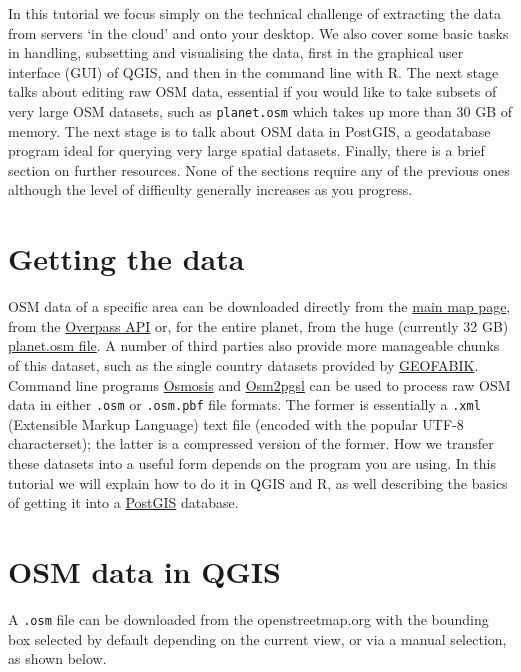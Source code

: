 \documentclass[]{article}
\begin{document}
In this tutorial we focus simply on the technical challenge of
extracting the data from servers `in the cloud' and onto your desktop.
We also cover some basic tasks in handling, subsetting and visualising
the data, first in the graphical user interface (GUI) of QGIS, and then
in the command line with R. The next stage talks about editing raw OSM
data, essential if you would like to take subsets of very large OSM
datasets, such as \texttt{planet.osm} which takes up more than 30 GB of
memory. The next stage is to talk about OSM data in PostGIS, a
geodatabase program ideal for querying very large spatial datasets.
Finally, there is a brief section on further resources. None of the
sections require any of the previous ones although the level of
difficulty generally increases as you progress.

\section{Getting the data}

OSM data of a specific area can be downloaded directly from the
\href{http://www.openstreetmap.org}{main map page}, from the
\href{http://overpass-api.de/}{Overpass API} or, for the entire planet,
from the huge (currently 32 GB)
\href{http://planet.openstreetmap.org/}{planet.osm file}. A number of
third parties also provide more manageable chunks of this dataset, such
as the single country datasets provided by
\href{http://download.geofabrik.de/}{GEOFABIK}. Command line programs
\href{http://wiki.openstreetmap.org/wiki/Osmosis}{Osmosis} and
\href{http://wiki.openstreetmap.org/wiki/Osm2pgsql}{Osm2pgsl} can be
used to process raw OSM data in either \texttt{.osm} or
\texttt{.osm.pbf} file formats. The former is essentially a
\texttt{.xml} (Extensible Markup Language) text file (encoded with the
popular UTF-8 characterset); the latter is a compressed version of the
former. How we transfer these datasets into a useful form depends on the
program you are using. In this tutorial we will explain how to do it in
QGIS and R, as well describing the basics of getting it into a
\href{http://postgis.net/}{PostGIS} database.

\section{OSM data in QGIS}

A \texttt{.osm} file can be downloaded from the openstreetmap.org with
the bounding box selected by default depending on the current view, or
via a manual selection, as shown below.
\end{document}
